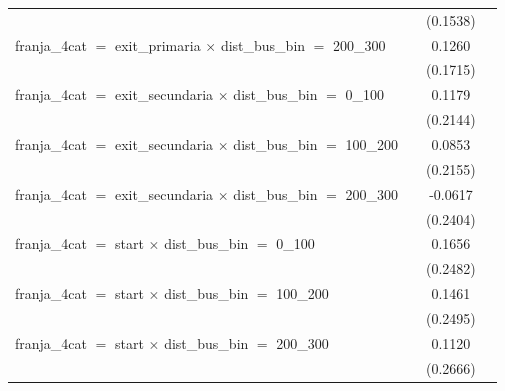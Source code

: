 \begin{tabular}{lccc}
                                                                                   &                 & (0.1538)             &   \\   
   franja\_4cat $=$ exit\_primaria $\times$ dist\_bus\_bin $=$ 200\_300            &                 & 0.1260               &   \\   
                                                                                   &                 & (0.1715)             &   \\   
   franja\_4cat $=$ exit\_secundaria $\times$ dist\_bus\_bin $=$ 0\_100            &                 & 0.1179               &   \\   
                                                                                   &                 & (0.2144)             &   \\   
   franja\_4cat $=$ exit\_secundaria $\times$ dist\_bus\_bin $=$ 100\_200          &                 & 0.0853               &   \\   
                                                                                   &                 & (0.2155)             &   \\   
   franja\_4cat $=$ exit\_secundaria $\times$ dist\_bus\_bin $=$ 200\_300          &                 & -0.0617              &   \\   
                                                                                   &                 & (0.2404)             &   \\   
   franja\_4cat $=$ start $\times$ dist\_bus\_bin $=$ 0\_100                       &                 & 0.1656               &   \\   
                                                                                   &                 & (0.2482)             &   \\   
   franja\_4cat $=$ start $\times$ dist\_bus\_bin $=$ 100\_200                     &                 & 0.1461               &   \\   
                                                                                   &                 & (0.2495)             &   \\   
   franja\_4cat $=$ start $\times$ dist\_bus\_bin $=$ 200\_300                     &                 & 0.1120               &   \\   
                                                                                   &                 & (0.2666)             &   \\   

\end{tabular}
